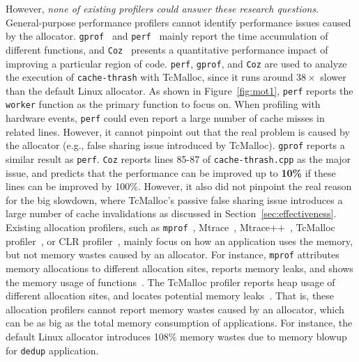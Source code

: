 However, \textit{none of existing profilers could answer these research questions}. General-purpose performance profilers cannot identify performance issues caused by the allocator. \texttt{gprof}~\cite{DBLP:conf/sigplan/GrahamKM82} and \texttt{perf}~\cite{perf} mainly report the time accumulation of different functions, and \texttt{Coz}~\cite{Coz} presents a quantitative performance impact of improving a particular region of code. \texttt{perf}, \texttt{gprof}, and \texttt{Coz} are used to analyze the execution of \texttt{cache-thrash} with TcMalloc, since it runs around $38\times$ slower than the default Linux allocator. As shown in Figure~\ref{fig:mot1}, \texttt{perf} reports the \texttt{worker} function as the primary function to focus on. When profiling with hardware events, \texttt{perf} could even report a large number of cache misses in related lines. However, it cannot pinpoint out that the real problem is caused by the  allocator (e.g., false sharing issue introduced by TcMalloc). \texttt{gprof} reports a similar result as \texttt{perf}. \texttt{Coz} reports lines 85-87 of \texttt{cache-thrash.cpp} as the major issue, and predicts that the performance can be improved up to \textbf{10\%} if these lines can be improved by 100\%. However, it 
also did not pinpoint the real reason for the big slowdown, where TcMalloc's passive false sharing issue introduces a large number of cache invalidations as discussed in Section~\ref{sec:effectiveness}. Existing allocation profilers, such as \texttt{mprof}~\cite{Zorn:1988:MAP:894814}, Mtrace~\cite{mtrace}, Mtrace++~\cite{Lee:2000:DMM:786772.787150}, TcMalloc profiler~\cite{tcmalloc-profiler}, or CLR profiler~\cite{lupasc2014dynamic}, mainly focus on how an application uses the memory, but not memory wastes caused by an allocator. For instance, \texttt{mprof} attributes memory allocations to different allocation sites, reports memory leaks, and shows the memory usage of functions~\cite{Zorn:1988:MAP:894814}. The TcMalloc profiler reports heap usage of different allocation sites, and locates potential memory leaks~\cite{tcmalloc-profiler}. That is, these allocation profilers cannot report memory wastes caused by an allocator, which can be as big as the total memory consumption of applications. For instance, the default Linux allocator introduces 108\% memory wastes due to memory blowup for \texttt{dedup} application. 

